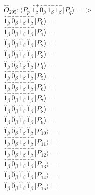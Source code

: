 \documentclass[14pt]{article}
\begin{document}
    $\hat{O}_{295}:  \langle{P_p}\vert \hat{1}_{\beta}^{+}\hat{0}_{\beta}^{+}\hat{1}_{\beta}^{-}\hat{1}_{\beta}^{-} \vert{P_q}\rangle => $ \\ 
    $ \hat{1}_{\beta}^{+}\hat{0}_{\beta}^{+}\hat{1}_{\beta}^{-}\hat{1}_{\beta}^{-} \vert{P_{0}}\rangle =  $ \\ 
    $ \hat{1}_{\beta}^{+}\hat{0}_{\beta}^{+}\hat{1}_{\beta}^{-}\hat{1}_{\beta}^{-} \vert{P_{1}}\rangle =  $ \\ 
    $ \hat{1}_{\beta}^{+}\hat{0}_{\beta}^{+}\hat{1}_{\beta}^{-}\hat{1}_{\beta}^{-} \vert{P_{2}}\rangle =  $ \\ 
    $ \hat{1}_{\beta}^{+}\hat{0}_{\beta}^{+}\hat{1}_{\beta}^{-}\hat{1}_{\beta}^{-} \vert{P_{3}}\rangle =  $ \\ 
    $ \hat{1}_{\beta}^{+}\hat{0}_{\beta}^{+}\hat{1}_{\beta}^{-}\hat{1}_{\beta}^{-} \vert{P_{4}}\rangle =  $ \\ 
    $ \hat{1}_{\beta}^{+}\hat{0}_{\beta}^{+}\hat{1}_{\beta}^{-}\hat{1}_{\beta}^{-} \vert{P_{5}}\rangle =  $ \\ 
    $ \hat{1}_{\beta}^{+}\hat{0}_{\beta}^{+}\hat{1}_{\beta}^{-}\hat{1}_{\beta}^{-} \vert{P_{6}}\rangle =  $ \\ 
    $ \hat{1}_{\beta}^{+}\hat{0}_{\beta}^{+}\hat{1}_{\beta}^{-}\hat{1}_{\beta}^{-} \vert{P_{7}}\rangle =  $ \\ 
    $ \hat{1}_{\beta}^{+}\hat{0}_{\beta}^{+}\hat{1}_{\beta}^{-}\hat{1}_{\beta}^{-} \vert{P_{8}}\rangle =  $ \\ 
    $ \hat{1}_{\beta}^{+}\hat{0}_{\beta}^{+}\hat{1}_{\beta}^{-}\hat{1}_{\beta}^{-} \vert{P_{9}}\rangle =  $ \\ 
    $ \hat{1}_{\beta}^{+}\hat{0}_{\beta}^{+}\hat{1}_{\beta}^{-}\hat{1}_{\beta}^{-} \vert{P_{10}}\rangle =  $ \\ 
    $ \hat{1}_{\beta}^{+}\hat{0}_{\beta}^{+}\hat{1}_{\beta}^{-}\hat{1}_{\beta}^{-} \vert{P_{11}}\rangle =  $ \\ 
    $ \hat{1}_{\beta}^{+}\hat{0}_{\beta}^{+}\hat{1}_{\beta}^{-}\hat{1}_{\beta}^{-} \vert{P_{12}}\rangle =  $ \\ 
    $ \hat{1}_{\beta}^{+}\hat{0}_{\beta}^{+}\hat{1}_{\beta}^{-}\hat{1}_{\beta}^{-} \vert{P_{13}}\rangle =  $ \\ 
    $ \hat{1}_{\beta}^{+}\hat{0}_{\beta}^{+}\hat{1}_{\beta}^{-}\hat{1}_{\beta}^{-} \vert{P_{14}}\rangle =  $ \\ 
    $ \hat{1}_{\beta}^{+}\hat{0}_{\beta}^{+}\hat{1}_{\beta}^{-}\hat{1}_{\beta}^{-} \vert{P_{15}}\rangle =  $ \\ 
    
\end{document}
